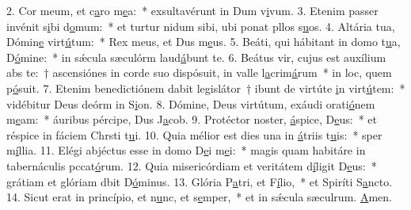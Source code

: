 2. Cor meum, et c\uline{a}ro m\uline{e}a:~* exsultavérunt in Dum v\uline{i}vum.
3. Etenim passer invénit s\uline{i}bi d\uline{o}mum:~* et turtur nidum sibi, ubi ponat pllos s\uline{u}os.
4. Altária tua, Dómin\uline{e} virt\uline{ú}tum:~* Rex meus, et Dus m\uline{e}us.
5. Beáti, qui hábitant in domo t\uline{u}a, D\uline{ó}mine:~* in sǽcula sæculórm laud\uline{á}bunt te.
6. Beátus vir, cujus est auxílium abs te:~† ascensiónes in corde suo dispósuit, in valle l\uline{a}crim\uline{á}rum~* in loc, quem p\uline{ó}suit.
7. Etenim benedictiónem dabit legislátor~† ibunt de virtúte \uline{i}n virt\uline{ú}tem:~* vidébitur Deus deórm in S\uline{i}on.
8. Dómine, Deus virtútum, exáudi orati\uline{ó}nem m\uline{e}am:~* áuribus pércipe, Dus J\uline{a}cob.
9. Protéctor noster, \uline{á}spice, D\uline{e}us:~* et réspice in fáciem Chrsti t\uline{u}i.
10. Quia mélior est dies una in \uline{á}triis t\uline{u}is:~* sper m\uline{í}llia.
11. Elégi abjéctus esse in domo D\uline{e}i m\uline{e}i:~* magis quam habitáre in tabernáculis pccat\uline{ó}rum.
12. Quia misericórdiam et veritátem d\uline{í}ligit D\uline{e}us:~* grátiam et glóriam dbit D\uline{ó}minus.
13. Glória P\uline{a}tri, et F\uline{í}lio,~* et Spiríti S\uline{a}ncto.
14. Sicut erat in princípio, et n\uline{u}nc, et s\uline{e}mper,~* et in sǽcula sæculrum. \uline{A}men.
